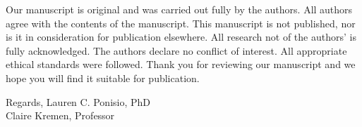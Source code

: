 \documentclass[12pt]{letter}
\begin{document}
\begin{letter}{}
  Our manuscript is original and was carried out fully by the authors.
  All authors agree with the contents of the manuscript.  This
  manuscript is not published, nor is it in consideration for
  publication elsewhere.  All research not of the authors' is fully
  acknowledged.  The authors declare no conflict of interest. All
  appropriate ethical standards were followed.  Thank you for
  reviewing our manuscript and we hope you will find it suitable for
  publication.
  
  Regards,
  Lauren C. Ponisio, PhD\\
  Claire Kremen, Professor
\end{letter}
\end{document}
